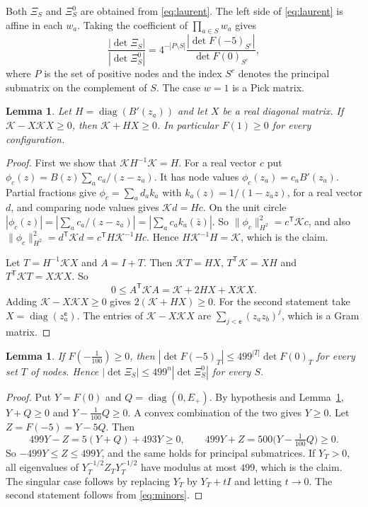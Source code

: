 \documentclass[11pt]{amsart}
\newtheorem{lemma}[theorem]{Lemma}
\theoremstyle{definition}
\theoremstyle{remark}
\numberwithin{equation}{section}
\newcommand{\cK}{\mathcal K}
\begin{document}
Both $\Xi_S$ and $\Xi^0_S$ are obtained from \eqref{eq:laurent}. The left side of \eqref{eq:laurent} is
affine in each $w_a$. Taking the coefficient of $\prod_{a\in S}w_a$ gives
\begin{equation}\label{eq:minors}
 \frac{|\det\Xi_S|}{|\det\Xi^0_S|}=4^{-|P\setminus S|}\frac{|\det F(-5)_{S^c}|}{\det F(0)_{S^c}},
\end{equation}
where $P$ is the set of positive nodes and the index $S^c$ denotes the principal submatrix on the complement of
$S$. The case $w=1$ is a Pick matrix.

\begin{lemma}\label{lem:pick}
Let $H=\operatorname{diag}(B'(z_a))$ and let $X$ be a real diagonal matrix. If $\cK-X\cK X\ge0$, then $\cK+HX\ge0$. In
particular $F(1)\ge0$ for every configuration.
\end{lemma}

\begin{proof}
First we show that $\cK H^{-1}\cK=H$. For a real vector $c$ put $\phi_c(z)=B(z)\sum_ac_a/(z-z_a)$. It has node values
$\phi_c(z_a)=c_aB'(z_a)$. Partial fractions give $\phi_c=\sum_ad_ak_a$ with $k_a(z)=1/(1-z_az)$, for a real vector $d$, and comparing node values
gives $\cK d=Hc$. On the unit circle $|\phi_c(z)|=|\sum_ac_a/(z-z_a)|=|\sum_ac_ak_a(\bar z)|$. So $\|\phi_c\|_{H^2}^2=c^{\mathsf T}\cK c$, and also
$\|\phi_c\|_{H^2}^2=d^{\mathsf T}\cK d=c^{\mathsf T}H\cK^{-1}Hc$. Hence $H\cK^{-1}H=\cK$, which is the claim.

Let $T=H^{-1}\cK X$ and $A=I+T$. Then $\cK T=HX$, $T^{\mathsf T}\cK=XH$ and $T^{\mathsf T}\cK T=X\cK X$. So
\[
 0\le A^{\mathsf T}\cK A=\cK+2HX+X\cK X .
\]
Adding $\cK-X\cK X\ge0$ gives $2(\cK+HX)\ge0$. For the second statement take $X=\operatorname{diag}(z_a^{\mathsf e})$. The entries of
$\cK-X\cK X$ are $\sum_{j<\mathsf e}(z_az_b)^j$, which is a Gram matrix.
\end{proof}

\begin{lemma}\label{lem:compare}
If $F(-\frac1{100})\ge0$, then $|\det F(-5)_T|\le499^{|T|}\det F(0)_T$ for every set $T$ of nodes. Hence
$|\det\Xi_S|\le499^n|\det\Xi^0_S|$ for every $S$.
\end{lemma}

\begin{proof}
Put $Y=F(0)$ and $Q=\operatorname{diag}(0,E_+)$. By hypothesis and Lemma~\ref{lem:pick}, $Y+Q\ge0$ and
$Y-\frac1{100}Q\ge0$. A convex combination of the two gives $Y\ge0$. Let $Z=F(-5)=Y-5Q$. Then
\[
 499Y-Z=5(Y+Q)+493Y\ge0,\qquad 499Y+Z=500\bigl(Y-\tfrac1{100}Q\bigr)\ge0 .
\]
So $-499Y\le Z\le499Y$, and the same holds for principal submatrices. If $Y_T>0$, all eigenvalues of
$Y_T^{-1/2}Z_TY_T^{-1/2}$ have modulus at most $499$, which is the claim. The singular case follows by replacing
$Y_T$ by $Y_T+tI$ and letting $t\to0$. The second statement follows from \eqref{eq:minors}.
\end{proof}
\end{document}
